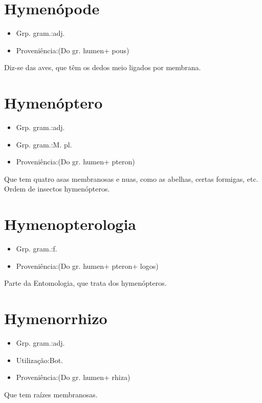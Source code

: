 \documentclass{article}
\begin{document}
\section{Hymenópode}
\begin{itemize}
\item {Grp. gram.:adj.}
\end{itemize}
\begin{itemize}
\item {Proveniência:(Do gr. \textunderscore humen\textunderscore  + \textunderscore pous\textunderscore )}
\end{itemize}
Diz-se das aves, que têm os dedos meio ligados por membrana.
\section{Hymenóptero}
\begin{itemize}
\item {Grp. gram.:adj.}
\end{itemize}
\begin{itemize}
\item {Grp. gram.:M. pl.}
\end{itemize}
\begin{itemize}
\item {Proveniência:(Do gr. \textunderscore humen\textunderscore  + \textunderscore pteron\textunderscore )}
\end{itemize}
Que tem quatro asas membranosas e nuas, como as abelhas, certas formigas, etc.
Ordem de insectos hymenópteros.
\section{Hymenopterologia}
\begin{itemize}
\item {Grp. gram.:f.}
\end{itemize}
\begin{itemize}
\item {Proveniência:(Do gr. \textunderscore humen\textunderscore  + \textunderscore pteron\textunderscore  + \textunderscore logos\textunderscore )}
\end{itemize}
Parte da Entomologia, que trata dos hymenópteros.
\section{Hymenorrhizo}
\begin{itemize}
\item {Grp. gram.:adj.}
\end{itemize}
\begin{itemize}
\item {Utilização:Bot.}
\end{itemize}
\begin{itemize}
\item {Proveniência:(Do gr. \textunderscore humen\textunderscore  + \textunderscore rhiza\textunderscore )}
\end{itemize}
Que tem raízes membranosas.
\end{document}
